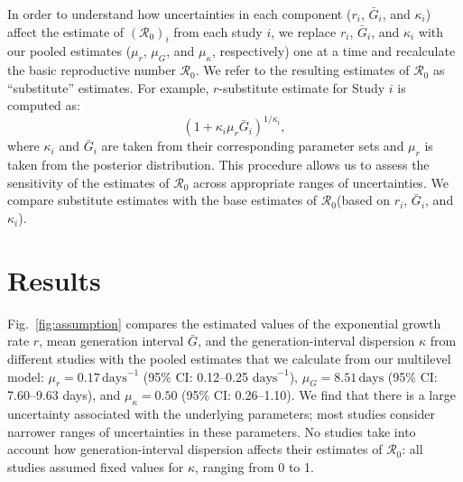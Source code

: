 \documentclass[12pt]{article}
\newcommand{\fref}[1]{Fig.~\ref{fig:#1}}
\newcommand{\Ro}{\ensuremath{{\mathcal R}_{0}}\xspace}
\begin{document}
In order to understand how uncertainties in each component ($r_i$, $\bar G_i$, and $\kappa_i$) affect the estimate of $(\Ro)_i$ from each study $i$, we replace $r_i$, $\bar G_i$, and $\kappa_i$ with our pooled estimates ($\mu_r$, $\mu_G$, and $\mu_\kappa$, respectively) one at a time and recalculate the basic reproductive number \Ro.
We refer to the resulting estimates of \Ro as ``substitute'' estimates.
For example, $r$-substitute estimate for Study $i$ is computed as:
\begin{equation}
\left(1 + \kappa_i \mu_r \bar{G}_i\right)^{1/\kappa_i},
\end{equation}
where $\kappa_i$ and $\bar{G}_i$ are taken from their corresponding parameter sets and $\mu_r$ is taken from the posterior distribution.
This procedure allows us to assess the sensitivity of the estimates of \Ro across appropriate ranges of uncertainties.
We compare substitute estimates with the base estimates of \Ro (based on $r_i$, $\bar G_i$, and $\kappa_i$).

\section{Results}

\fref{assumption} compares the estimated values of the exponential growth rate $r$, mean generation interval $\bar G$, and the generation-interval dispersion $\kappa$ from different studies with the pooled estimates that we calculate from our multilevel model:
$\mu_r = 0.17\,\textrm{days}^{-1}$ (95\% CI: 0.12--0.25 $\textrm{days}^{-1}$),
$\mu_G = 8.51\,\textrm{days}$ (95\% CI: 7.60--9.63 days),
and
$\mu_\kappa = 0.50$ (95\% CI: 0.26--1.10).
We find that there is a large uncertainty associated with the underlying parameters;
most studies consider narrower ranges of uncertainties in these parameters.
No studies take into account how generation-interval dispersion affects their estimates of \Ro:
all studies assumed fixed values for $\kappa$, ranging from 0 to 1.
\end{document}
